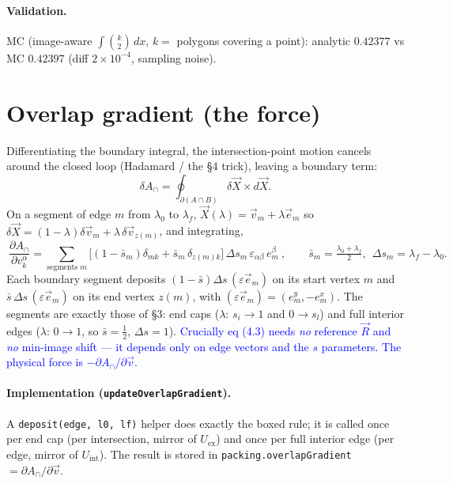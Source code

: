 \documentclass[11pt]{article}
\newcommand{\vv}[1]{\vec{#1}}
\newcommand{\eps}{\varepsilon}
\newcommand{\half}{\tfrac{1}{2}}
\newcommand{\code}[1]{\texttt{#1}}
\newcommand{\note}[1]{\textcolor{blue}{#1}}
\begin{document}
\paragraph{Validation.} MC (image-aware $\int\binom{k}{2}\,dx$, $k=$ polygons covering a point):
analytic $0.42377$ vs MC $0.42397$ (diff $2\times10^{-4}$, sampling noise).

\section{Overlap gradient (the force)}

Differentiating the boundary integral, the intersection-point motion cancels around the closed loop
(Hadamard / the \S4 trick), leaving a boundary term:
\begin{equation}
  \delta A_\cap=\oint_{\partial(A\cap B)}\delta\vv X\times d\vv X .
\end{equation}
On a segment of edge $m$ from $\lambda_0$ to $\lambda_f$, $\vv X(\lambda)=\vv v_m+\lambda\vv e_m$ so
$\delta\vv X=(1-\lambda)\delta\vv v_m+\lambda\,\delta\vv v_{z(m)}$, and integrating,
\begin{equation}
  \boxed{\ \frac{\partial A_\cap}{\partial v_k^\alpha}
  =\sum_{\text{segments }m}\big[(1-\bar s_m)\delta_{mk}+\bar s_m\,\delta_{z(m)k}\big]\,
   \Delta s_m\,\eps_{\alpha\beta}\,e_m^\beta\ },\qquad
  \bar s_m=\tfrac{\lambda_0+\lambda_f}{2},\ \ \Delta s_m=\lambda_f-\lambda_0 .
\end{equation}
Each boundary segment deposits $(1-\bar s)\Delta s\,(\eps\vv e_m)$ on its start vertex $m$ and $\bar
s\,\Delta s\,(\eps\vv e_m)$ on its end vertex $z(m)$, with $(\eps\vv e_m)=(e_m^y,-e_m^x)$. The
segments are exactly those of \S3: end caps ($\lambda\!:\,s_i\!\to\!1$ and $0\!\to\!s_l$) and full
interior edges ($\lambda\!:\,0\!\to\!1$, so $\bar s=\half$, $\Delta s=1$). \note{Crucially eq (4.3)
needs \emph{no} reference $\vv R$ and \emph{no} min-image shift --- it depends only on edge vectors
and the $s$ parameters. The physical force is $-\partial A_\cap/\partial\vv v$.}

\paragraph{Implementation (\code{updateOverlapGradient}).} A \code{deposit(edge,\,l0,\,lf)} helper
does exactly the boxed rule; it is called once per end cap (per intersection, mirror of $U_{\text{ex}}$)
and once per full interior edge (per edge, mirror of $U_{\text{int}}$). The result is stored in
\code{packing.overlapGradient} $=\partial A_\cap/\partial\vv v$.
\end{document}
